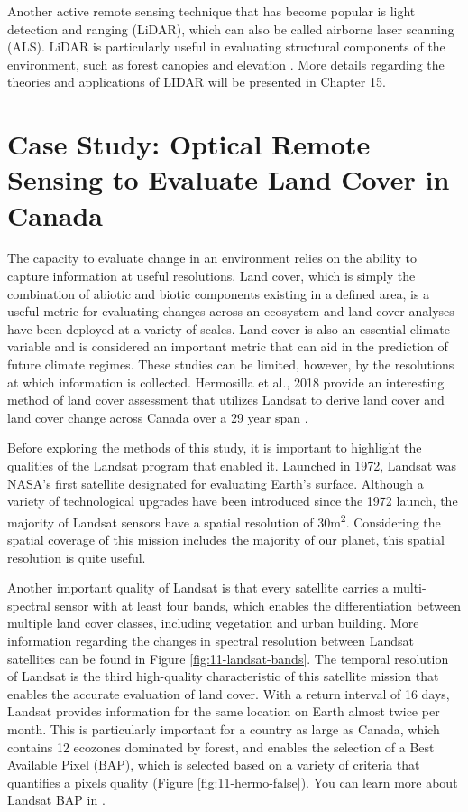 \documentclass[
]{book}
\begin{document}
Another active remote sensing technique that has become popular is light
detection and ranging (LiDAR), which can also be called airborne laser
scanning (ALS). LiDAR is particularly useful in evaluating structural
components of the environment, such as forest canopies and elevation
\citep{coops2007}. More details regarding the theories and applications of
LIDAR will be presented in Chapter 15.

\hypertarget{case-study-optical-remote-sensing-to-evaluate-land-cover-in-canada}{%
\section{Case Study: Optical Remote Sensing to Evaluate Land Cover in Canada}\label{case-study-optical-remote-sensing-to-evaluate-land-cover-in-canada}}

The capacity to evaluate change in an environment relies on the ability
to capture information at useful resolutions. Land cover, which is
simply the combination of abiotic and biotic components existing in a
defined area, is a useful metric for evaluating changes across an
ecosystem and land cover analyses have been deployed at a variety of
scales. Land cover is also an essential climate variable and is
considered an important metric that can aid in the prediction of future
climate regimes. These studies can be limited, however, by the
resolutions at which information is collected. Hermosilla et al., 2018
provide an interesting method of land cover assessment that utilizes
Landsat to derive land cover and land cover change across Canada over a
29 year span \citep{hermosilla2018}.

Before exploring the methods of this study, it is important to highlight
the qualities of the Landsat program that enabled it. Launched in 1972,
Landsat was NASA's first satellite designated for evaluating Earth's
surface. Although a variety of technological upgrades have been
introduced since the 1972 launch, the majority of Landsat sensors have a
spatial resolution of 30m\textsuperscript{2}. Considering the spatial coverage of this
mission includes the majority of our planet, this spatial resolution is
quite useful.

Another important quality of Landsat is that every satellite carries a
multi-spectral sensor with at least four bands, which enables the
differentiation between multiple land cover classes, including
vegetation and urban building. More information regarding the changes in
spectral resolution between Landsat satellites can be found in Figure
\ref{fig:11-landsat-bands}. The temporal resolution of Landsat is the
third high-quality characteristic of this satellite mission that enables
the accurate evaluation of land cover. With a return interval of 16
days, Landsat provides information for the same location on Earth almost
twice per month. This is particularly important for a country as large
as Canada, which contains 12 ecozones dominated by forest, and enables
the selection of a Best Available Pixel (BAP), which is selected based
on a variety of criteria that quantifies a pixels quality (Figure
\ref{fig:11-hermo-false}). You can learn more about Landsat BAP in
\citep{thompson2015}.
\end{document}

